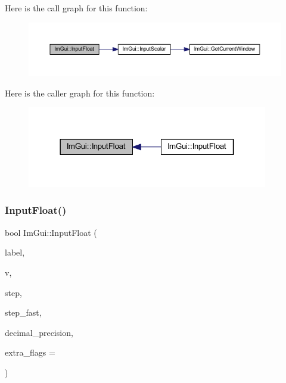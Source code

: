 Here is the call graph for this function\+:
\nopagebreak
\begin{figure}[H]
\begin{center}
\leavevmode
\includegraphics[width=350pt]{namespace_im_gui_af10a28bbd9577edd54849516819872f5_cgraph}
\end{center}
\end{figure}
Here is the caller graph for this function\+:
\nopagebreak
\begin{figure}[H]
\begin{center}
\leavevmode
\includegraphics[width=298pt]{namespace_im_gui_af10a28bbd9577edd54849516819872f5_icgraph}
\end{center}
\end{figure}
\mbox{\label{namespace_im_gui_a15edd4acce19b15d9309d3cab51445be}} 
\subsubsection{\texorpdfstring{Input\+Float()}{InputFloat()}\hspace{0.1cm}{\footnotesize\ttfamily [2/2]}}
{\footnotesize\ttfamily bool Im\+Gui\+::\+Input\+Float (\begin{DoxyParamCaption}\item[{const char $\ast$}]{label,  }\item[{float $\ast$}]{v,  }\item[{float}]{step,  }\item[{float}]{step\+\_\+fast,  }\item[{int}]{decimal\+\_\+precision,  }\item[{\mbox{\hyperlink{imgui_8h_a7d2c6153a6b9b5d3178ce82434ac9fb8}{Im\+Gui\+Input\+Text\+Flags}}}]{extra\+\_\+flags = {} }\end{DoxyParamCaption})}


